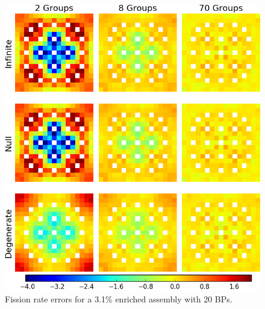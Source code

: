 \begin{figure}[h!]
\centering
\includegraphics[width=\linewidth]{figures/quantification/assm-31-20BPs/fiss-err}
\caption[Fission rate errors for a 3.1\% enriched assembly with 20 BPs]{Fission rate errors for a 3.1\% enriched assembly with 20 BPs.}
\label{fig:chap8-assm-3.1-20BPs-fiss-err}
\end{figure}

